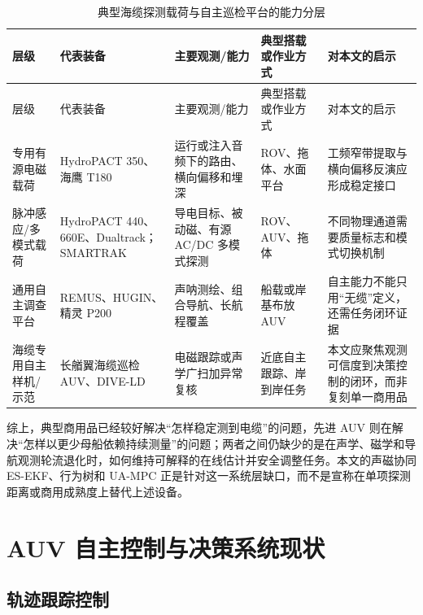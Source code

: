 \begin{longtable}[]{@{}
  >{\raggedright\arraybackslash}p{}
  >{\raggedright\arraybackslash}p{}
  >{\raggedright\arraybackslash}p{}
  >{\raggedright\arraybackslash}p{}
  >{\raggedright\arraybackslash}p{}@{}}
\caption{典型海缆探测载荷与自主巡检平台的能力分层}\label{tab:ch01-cable-inspection-equipment}\tabularnewline
\toprule\noalign{}
层级 & 代表装备 & 主要观测/能力 & 典型搭载或作业方式 & 对本文的启示 \\
\midrule\noalign{}
\endfirsthead
\toprule\noalign{}
层级 & 代表装备 & 主要观测/能力 & 典型搭载或作业方式 & 对本文的启示 \\
\midrule\noalign{}
\endhead
\bottomrule\noalign{}
\endlastfoot
专用有源电磁载荷 & HydroPACT 350、海鹰 T180 & 运行或注入音频下的路由、横向偏移和埋深 & ROV、拖体、水面平台 & 工频窄带提取与横向偏移反演应形成稳定接口 \\
脉冲感应/多模式载荷 & HydroPACT 440、660E、Dualtrack；SMARTRAK & 导电目标、被动磁、有源 AC/DC 多模式探测 & ROV、AUV、拖体 & 不同物理通道需要质量标志和模式切换机制 \\
通用自主调查平台 & REMUS、HUGIN、精灵 P200 & 声呐测绘、组合导航、长航程覆盖 & 船载或岸基布放 AUV & 自主能力不能只用``无缆''定义，还需任务闭环证据 \\
海缆专用自主样机/示范 & 长艏翼海缆巡检 AUV、DIVE-LD & 电磁跟踪或声学广扫加异常复核 & 近底自主跟踪、岸到岸任务 & 本文应聚焦观测可信度到决策控制的闭环，而非复刻单一商用品 \\
\end{longtable}

\endgroup

综上，典型商用品已经较好解决``怎样稳定测到电缆''的问题，先进 AUV 则在解决``怎样以更少母船依赖持续测量''的问题；两者之间仍缺少的是在声学、磁学和导航观测轮流退化时，如何维持可解释的在线估计并安全调整任务。本文的声磁协同 ES-EKF、行为树和 UA-MPC 正是针对这一系统层缺口，而不是宣称在单项探测距离或商用成熟度上替代上述设备。

\section{AUV 自主控制与决策系统现状}\label{sec:ch01-1-3}

\subsection{轨迹跟踪控制}\label{sec:ch01-1-3-1}

